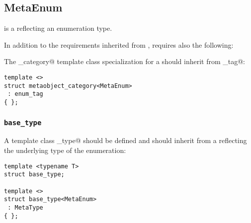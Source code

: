 \subsection{MetaEnum}
\label{concept-MetaEnum}

 is a  reflecting an enumeration type.

In addition to the requirements inherited from ,  requires
also the following:

The \verb@metaobject_category@ template class specialization for a  should
inherit from \verb@enum_tag@:

\begin{verbatim}
template <>
struct metaobject_category<MetaEnum>
 : enum_tag
{ };
\end{verbatim}

\subsubsection{\texttt{base\_type}}

A template class \verb@base_type@ should be defined and should inherit from
a  reflecting the underlying type of the enumeration:

\begin{verbatim}
template <typename T>
struct base_type;

template <>
struct base_type<MetaEnum>
 : MetaType
{ };
\end{verbatim}

